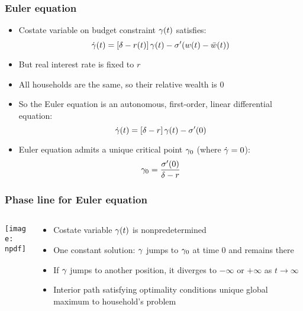 \documentclass[11pt,aspectratio=169,xcolor={dvipsnames},hyperref={pdftex,pdfpagemode=UseNone,hidelinks,pdfdisplaydoctitle=true},usepdftitle=false]{beamer}
\newcommand{\npdf}{../figures/figures3.pdf}
\begin{document}
\begin{frame}
\end{frame}

\begin{frame}
\frametitle{Euler equation}
\begin{itemize}
\item Costate variable on budget constraint $\gamma(t)$ satisfies:
\begin{equation*}
\dot{\gamma}(t) = \left[ \delta - r(t) \right] \gamma(t) - \sigma'(w(t)-\bar{w}(t))
\end{equation*}
\item But real interest rate is fixed to $r$
\item All households are the same, so their relative wealth is $0$
\item So the Euler equation is an autonomous, first-order, linear differential equation:
\begin{equation*}
\dot{\gamma}(t) = \left[ \delta - r \right] \gamma(t) - \sigma'(0)
\end{equation*}
\item Euler equation admits a unique critical point $\gamma_0$ (where $\dot{\gamma}=0$):
\begin{equation*}
\gamma_0 =  \frac{\sigma'(0)}{\delta - r}
\end{equation*}
\end{itemize}	
\end{frame}

\begin{frame}
\frametitle{Phase line for Euler equation}
\begin{columns}
\begin{column}{0.6\textwidth}
\texttt{[image: \\npdf]}%
\end{column}
\begin{column}{0.4\textwidth}
\begin{itemize}
	\item Costate variable $\gamma(t)$ is nonpredetermined
	\item One constant solution: $\gamma$ jumps to $\gamma_0$ at time $0$ and remains there
	\item If $\gamma$ jumps to another position, it diverges to $-\infty$ or $+\infty$ as $t\to \infty$
	\item Interior path satisfying optimality conditions \then unique global maximum to household's problem
\end{itemize}
\end{column}  
\end{columns}
\end{frame}
\end{document}
